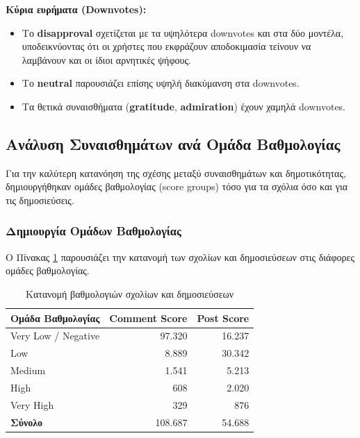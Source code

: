 \documentclass[a4paper,11pt,oneside,openany]{ioniothesis}
\begin{document}
\textbf{Κύρια ευρήματα (Downvotes):}
\begin{itemize}
    \item Το \textbf{disapproval} σχετίζεται με τα υψηλότερα downvotes και στα δύο μοντέλα, υποδεικνύοντας ότι οι χρήστες που εκφράζουν αποδοκιμασία τείνουν να λαμβάνουν και οι ίδιοι αρνητικές ψήφους.
    \item Το \textbf{neutral} παρουσιάζει επίσης υψηλή διακύμανση στα downvotes.
    \item Τα θετικά συναισθήματα (\textbf{gratitude}, \textbf{admiration}) έχουν χαμηλά downvotes.
\end{itemize}

\subsection{Ανάλυση Συναισθημάτων ανά Ομάδα Βαθμολογίας}
\label{sec:Ανάλυση Συναισθημάτων ανά Ομάδα Βαθμολογίας}

Για την καλύτερη κατανόηση της σχέσης μεταξύ συναισθημάτων και δημοτικότητας, δημιουργήθηκαν ομάδες βαθμολογίας (score groups) τόσο για τα σχόλια όσο και για τις δημοσιεύσεις.

\subsubsection{Δημιουργία Ομάδων Βαθμολογίας}
\label{sec:Δημιουργία Ομάδων Βαθμολογίας}

Ο Πίνακας \ref{tab:score_groups} παρουσιάζει την κατανομή των σχολίων και δημοσιεύσεων στις διάφορες ομάδες βαθμολογίας.

\begin{table}[H]
\centering
\caption{Κατανομή βαθμολογιών σχολίων και δημοσιεύσεων}
\label{tab:score_groups}
\begin{tabular}{@{}lrr@{}}
\toprule
\textbf{Ομάδα Βαθμολογίας} & \textbf{Comment Score} & \textbf{Post Score} \\
\midrule
Very Low / Negative & 97.320 & 16.237 \\
Low & 8.889 & 30.342 \\
Medium & 1.541 & 5.213 \\
High & 608 & 2.020 \\
Very High & 329 & 876 \\
\midrule
\textbf{Σύνολο} & 108.687 & 54.688 \\
\bottomrule
\end{tabular}
\end{table}
\end{document}
